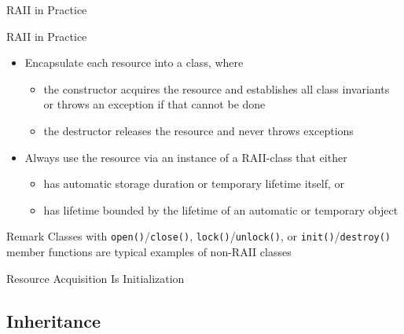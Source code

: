 \begin{frame}{RAII in Practice}{}
  \begin{block}{RAII in Practice}
    \begin{itemize}
    \item
      Encapsulate each resource into a class, where
      \begin{itemize}
      \item
        the constructor acquires the resource and establishes all class invariants or throws an exception if that cannot be done
      \item
        the destructor releases the resource and never throws exceptions
      \end{itemize}
    \item
      Always use the resource via an instance of a RAII-class that either
      \begin{itemize}
      \item
        has automatic storage duration or temporary lifetime itself, or
      \item
        has lifetime bounded by the lifetime of an automatic or temporary object
      \end{itemize}
    \end{itemize}
  \end{block}

  \begin{block}{Remark}
    Classes with \lstinline!open()!/\lstinline!close()!, \lstinline!lock()!/\lstinline!unlock()!, or \lstinline!init()!/\lstinline!destroy()! member functions are typical examples of non-RAII classes
  \end{block}
\end{frame}

\begin{frame}{Resource Acquisition Is Initialization}{}
  \begin{example}
  \end{example}
\end{frame}


\subsection{Inheritance}

